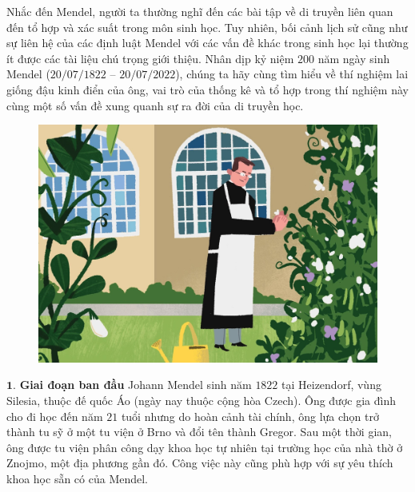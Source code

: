 \begin{multicols}{2}
	Nhắc đến Mendel, người ta thường nghĩ đến các bài tập về di truyền liên quan đến tổ hợp và xác suất trong môn sinh học. Tuy nhiên, bối cảnh lịch sử cũng như sự liên hệ của các định luật Mendel với các vấn đề khác trong sinh học lại thường ít được các tài liệu chú trọng giới thiệu. Nhân dịp kỷ niệm $200$ năm ngày sinh Mendel ($20/07/1822$ -- $20/07/2022$), chúng ta hãy cùng tìm hiểu về thí nghiệm lai giống đậu kinh điển của ông, vai trò của thống kê và tổ hợp trong thí nghiệm này cùng một số vấn đề xung quanh sự ra đời của di truyền học.
	\begin{figure}[H]
		\centering
		\vspace*{-5pt}
		\captionsetup{labelformat= empty, justification=centering}
		\includegraphics[width=1\linewidth]{image011}
		\vspace*{-15pt}
	\end{figure}
	$\pmb{1.}$ \textbf{\color{timhieukhoahoc}Giai đoạn ban đầu}
	\vskip 0.1cm
	Johann Mendel sinh năm $1822$ tại Heizendorf, vùng Silesia, thuộc đế quốc Áo (ngày nay thuộc cộng hòa Czech). Ông được gia đình cho đi học đến năm $21$ tuổi nhưng do hoàn cảnh tài chính, ông lựa chọn trở thành tu sỹ ở một tu viện ở Brno và đổi tên thành Gregor.
	\vskip 0.1cm
	Sau một thời gian, ông được tu viện phân công dạy khoa học tự nhiên tại trường học của nhà thờ ở Znojmo, một địa phương gần đó. Công việc này cũng phù hợp với sự yêu thích khoa học sẵn có của Mendel. 
	\vskip 0.1cm

\end{multicols}
